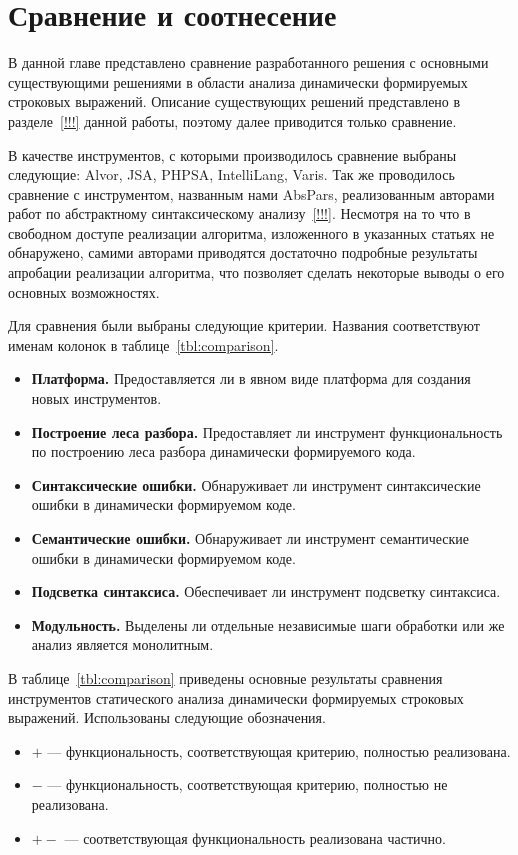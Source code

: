\chapter{Сравнение и соотнесение} \label{chaptComp}

В данной главе представлено сравнение разработанного решения с основными существующими решениями в области анализа динамически формируемых строковых выражений. Описание существующих решений представлено в разделе~\ref{!!!} данной работы, поэтому далее приводится только сравнение.

В качестве инструментов, с которыми производилось сравнение выбраны следующие: Alvor, JSA, PHPSA, IntelliLang, Varis. Так же проводилось сравнение с инструментом, названным нами AbsPars, реализованным авторами работ по абстрактному синтаксическому анализу~\ref{!!!}. Несмотря на то что в свободном доступе реализации алгоритма, изложенного в указанных статьях не обнаружено, самими авторами приводятся достаточно подробные результаты апробации реализации алгоритма, что позволяет сделать некоторые выводы о его основных возможностях.

Для сравнения были выбраны следующие критерии. Названия соответствуют именам колонок в таблице~\ref{tbl:comparison}.
\begin{itemize}
    \item \textbf{Платформа.} Предоставляется ли в явном виде платформа для создания новых инструментов. 
    \item \textbf{Построение леса разбора.} Предоставляет ли инструмент функциональность по построению леса разбора динамически формируемого кода.
    \item \textbf{Синтаксические ошибки.} Обнаруживает ли инструмент синтаксические ошибки в динамически формируемом коде.
    \item \textbf{Семантические ошибки.} Обнаруживает ли инструмент семантические ошибки в динамически формируемом коде.
    \item \textbf{Подсветка синтаксиса.} Обеспечивает ли инструмент подсветку синтаксиса.
    \item \textbf{Модульность.} Выделены ли отдельные независимые шаги обработки или же анализ является монолитным.
\end{itemize}

В таблице~\ref{tbl:comparison} приведены основные результаты сравнения инструментов статического анализа динамически формируемых строковых выражений. Использованы следующие обозначения.
\begin{itemize}
    \item $+$ --- функциональность, соответствующая критерию, полностью реализована.
    \item $-$ --- функциональность, соответствующая критерию, полностью не реализована.
    \item $+-$ --- соответствующая функциональность реализована частично.   
\end{itemize}

